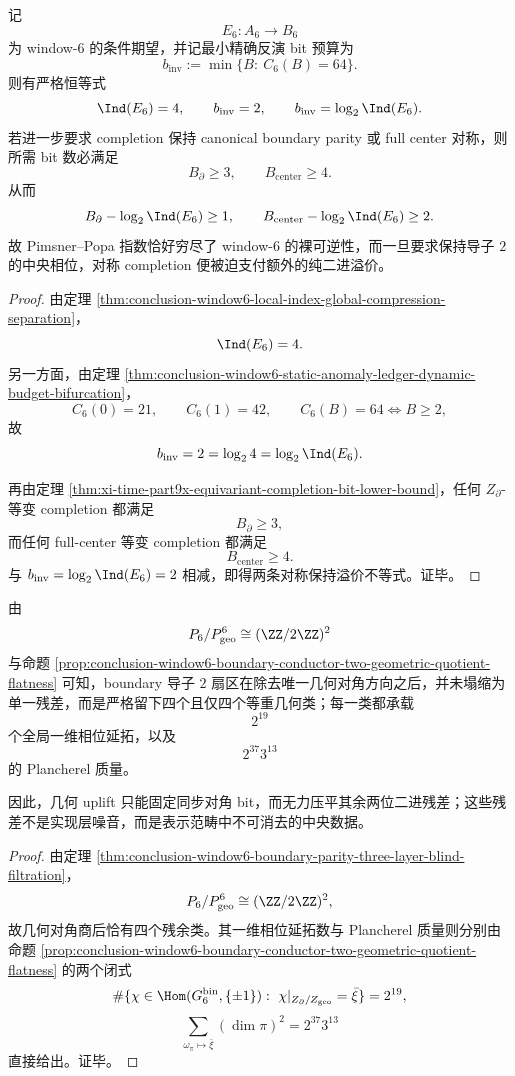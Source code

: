 \begin{theorem}[局域规范指数的二进对数律与对称保持溢价]\label{thm:conclusion-window6-local-index-binary-log-symmetry-surcharge}
记
\[
E_6:A_6\to B_6
\]
为 window-\(6\) 的条件期望，并记最小精确反演 bit 预算为
\[
b_{\mathrm{inv}}
:=
\min\{B:\ C_6(B)=64\}.
\]
则有严格恒等式
\[
\Ind(E_6)=4,
\qquad
b_{\mathrm{inv}}=2,
\qquad
b_{\mathrm{inv}}=\log_2\Ind(E_6).
\]
若进一步要求 completion 保持 canonical boundary parity 或 full center 对称，则所需 bit 数必满足
\[
B_{\partial}\ge 3,
\qquad
B_{\mathrm{center}}\ge 4.
\]
从而
\[
B_{\partial}-\log_2\Ind(E_6)\ge 1,
\qquad
B_{\mathrm{center}}-\log_2\Ind(E_6)\ge 2.
\]
故 Pimsner--Popa 指数恰好穷尽了 window-\(6\) 的裸可逆性，而一旦要求保持导子 \(2\) 的中央相位，对称 completion 便被迫支付额外的纯二进溢价。
\end{theorem}
\begin{proof}
由定理 \ref{thm:conclusion-window6-local-index-global-compression-separation}，
\[
\Ind(E_6)=4.
\]
另一方面，由定理 \ref{thm:conclusion-window6-static-anomaly-ledger-dynamic-budget-bifurcation}，
\[
C_6(0)=21,\qquad C_6(1)=42,\qquad C_6(B)=64\iff B\ge 2,
\]
故
\[
b_{\mathrm{inv}}=2=\log_2 4=\log_2\Ind(E_6).
\]

再由定理 \ref{thm:xi-time-part9x-equivariant-completion-bit-lower-bound}，任何 \(Z_{\partial}\)-等变 completion 都满足
\[
B_{\partial}\ge 3,
\]
而任何 full-center 等变 completion 都满足
\[
B_{\mathrm{center}}\ge 4.
\]
与 \(b_{\mathrm{inv}}=\log_2\Ind(E_6)=2\) 相减，即得两条对称保持溢价不等式。证毕。
\end{proof}

\begin{corollary}[几何对角数据对表示范畴并不稠密]\label{cor:conclusion-window6-geometric-diagonal-fourfold-residual-cover}
由
\[
P_6/P_{\mathrm{geo}}^6\cong (\ZZ/2\ZZ)^2
\]
与命题 \ref{prop:conclusion-window6-boundary-conductor-two-geometric-quotient-flatness} 可知，boundary 导子 \(2\) 扇区在除去唯一几何对角方向之后，并未塌缩为单一残差，而是严格留下四个且仅四个等重几何类；每一类都承载
\[
2^{19}
\]
个全局一维相位延拓，以及
\[
2^{37}3^{13}
\]
的 Plancherel 质量。

因此，几何 uplift 只能固定同步对角 bit，而无力压平其余两位二进残差；这些残差不是实现层噪音，而是表示范畴中不可消去的中央数据。
\end{corollary}
\begin{proof}
由定理 \ref{thm:conclusion-window6-boundary-parity-three-layer-blind-filtration}，
\[
P_6/P_{\mathrm{geo}}^6\cong (\ZZ/2\ZZ)^2,
\]
故几何对角商后恰有四个残余类。其一维相位延拓数与 Plancherel 质量则分别由命题 \ref{prop:conclusion-window6-boundary-conductor-two-geometric-quotient-flatness} 的两个闭式
\[
\#\{\chi\in \Hom(G_6^{\mathrm{bin}},\{\pm1\}):\ \chi|_{Z_{\partial}/Z_{\mathrm{geo}}}=\bar\xi\}=2^{19},
\]
\[
\sum_{\omega_\pi\mapsto \bar\xi}(\dim\pi)^2=2^{37}3^{13}
\]
直接给出。证毕。
\end{proof}
